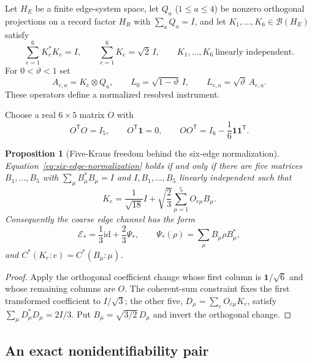 \documentclass[11pt]{article}
\newtheorem{proposition}[theorem]{Proposition}
\theoremstyle{definition}
\theoremstyle{remark}
\newcommand{\id}{\mathrm{id}}
\begin{document}
Let $H_E$ be a finite edge-system space, let
$Q_a$ ($1\le a\le4$) be nonzero orthogonal projections on a record factor
$H_R$ with $\sum_aQ_a=I$, and let $K_1,\ldots,K_6\in\mathcal B(H_E)$ satisfy
\begin{equation}
 \sum_{e=1}^6K_e^*K_e=I,
 \qquad
 \sum_{e=1}^6K_e=\sqrt2\,I,
 \qquad
 K_1,\ldots,K_6\ \text{linearly independent}.
 \label{eq:six-edge-normalization}
\end{equation}
For $0<\vartheta<1$ set
\[
 A_{e,a}=K_e\otimes Q_a,
 \qquad L_0=\sqrt{1-\vartheta}\,I,
 \qquad L_{e,a}=\sqrt\vartheta\,A_{e,a}.
\]
These operators define a normalized resolved instrument.

Choose a real $6\times5$ matrix $O$ with
\begin{equation}
 O^{\mathsf T}O=I_5,
 \qquad O^{\mathsf T}\mathbf1=0,
 \qquad OO^{\mathsf T}=I_6-\frac16\mathbf1\mathbf1^{\mathsf T}.
 \label{eq:helmert-frame}
\end{equation}

\begin{proposition}[Five-Kraus freedom behind the six-edge normalization]
\label{prop:five-kraus-freedom}
Equation~\eqref{eq:six-edge-normalization} holds if and only if there are
five matrices $B_1,\ldots,B_5$ with
$\sum_\mu B_\mu^*B_\mu=I$ and
$I,B_1,\ldots,B_5$ linearly independent such that
\begin{equation}
 \boxed{K_e=\frac1{\sqrt{18}}I
       +\sqrt{\frac23}\sum_{\mu=1}^5O_{e\mu}B_\mu.}
 \label{eq:six-edge-normal-form}
\end{equation}
Consequently the coarse edge channel has the form
\[
 \mathcal E_* =\frac13\id+\frac23\Psi_*,
 \qquad \Psi_*(\rho)=\sum_\mu B_\mu\rho B_\mu^*,
\]
and $C^*(K_e:e)=C^*(B_\mu:\mu)$.
\end{proposition}

\begin{proof}
Apply the orthogonal coefficient change whose first column is
$\mathbf1/\sqrt6$ and whose remaining columns are $O$.  The coherent-sum
constraint fixes the first transformed coefficient to $I/\sqrt3$; the other
five, $D_\mu=\sum_eO_{e\mu}K_e$, satisfy
$\sum_\mu D_\mu^*D_\mu=2I/3$.  Put
$B_\mu=\sqrt{3/2}\,D_\mu$ and invert the orthogonal change.
\end{proof}

\subsection{An exact nonidentifiability pair}
\end{document}
